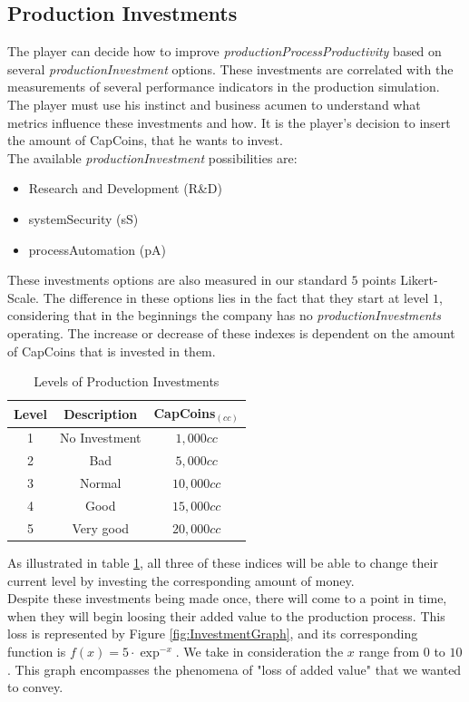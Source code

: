 \subsection{Production Investments}
The player can decide how to improve \textit{productionProcessProductivity} based on several \textit{productionInvestment} options. These investments are correlated with the measurements of several performance indicators in the production simulation. The player must use his instinct and business acumen to understand what metrics influence these investments and how. It is the player's decision to insert the amount of CapCoins, that he wants to invest. \\
The available \textit{productionInvestment} possibilities are:
\begin{itemize}
\item Research and Development (R\&D)
\item systemSecurity (\gls{sS})
\item processAutomation (pA)
\end{itemize}
These investments options are also measured in our standard $5$ points Likert-Scale. The difference in these options lies in the fact that they start at level $1$, considering that in the beginnings the company has no \textit{productionInvestments} operating. The increase or decrease of these indexes is dependent on the amount of CapCoins that is invested in them.
\begin{table}[ht]
\centering
\begin{tabular}{c|c|c}
\hline
 Level & Description & CapCoins$_{(cc)}$\\
\hline \hline
 1 & No Investment & $1,000cc$ \\
 2 & Bad & $ 5,000cc$\\
 3 & Normal & $10,000cc$ \\
 4 & Good & $15,000cc$ \\
 5 & Very good & $20,000cc$\\
\hline
\end{tabular}
\caption{Levels of Production Investments}
\label{table:prod-investments}
\end{table}
As illustrated in table \ref{table:prod-investments}, all three of these indices will be able to change their current level by investing the corresponding amount of money.\\
Despite these investments being made once, there will come to a point in time, when they will begin loosing their added value to the production process. This loss is represented by Figure \ref{fig:InvestmentGraph}, and its corresponding function is $f(x)=5\cdot\exp^{-x}$. We take in consideration the $x$ range from $0$ to $10$. This graph encompasses the phenomena of "loss of added value" that we wanted to convey.

